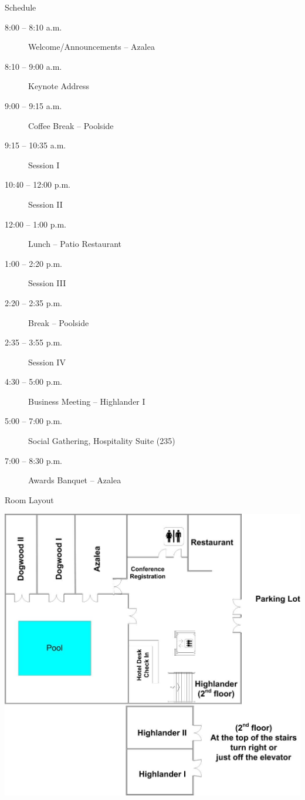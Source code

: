 \documentclass[handout]{beamer}
\begin{document}
\begin{frame}{Schedule}
    \begin{description}
        \item[8:00 -- 8:10 a.m.] Welcome/Announcements -- Azalea
        \item[8:10 -- 9:00 a.m.] Keynote Address
        \item[9:00 -- 9:15 a.m.] Coffee Break -- Poolside
        \item[9:15 -- 10:35 a.m.] Session I
        \item[10:40 -- 12:00 p.m.] Session II
        \item[12:00 -- 1:00 p.m.] Lunch -- Patio Restaurant
        \item[1:00 -- 2:20 p.m.] Session III
        \item[2:20 -- 2:35 p.m.] Break -- Poolside
        \item[2:35 -- 3:55 p.m.] Session IV
        \item[4:30 -- 5:00 p.m.] Business Meeting -- Highlander I
        \item[5:00 -- 7:00 p.m.] Social Gathering, Hospitality Suite (235)
        \item[7:00 -- 8:30 p.m.] Awards Banquet -- Azalea
    \end{description}
\end{frame}

\begin{frame}{Room Layout}
    \begin{center}
        \includegraphics[height=0.85\textheight]{floorplan}
    \end{center}
\end{frame}
\end{document}
